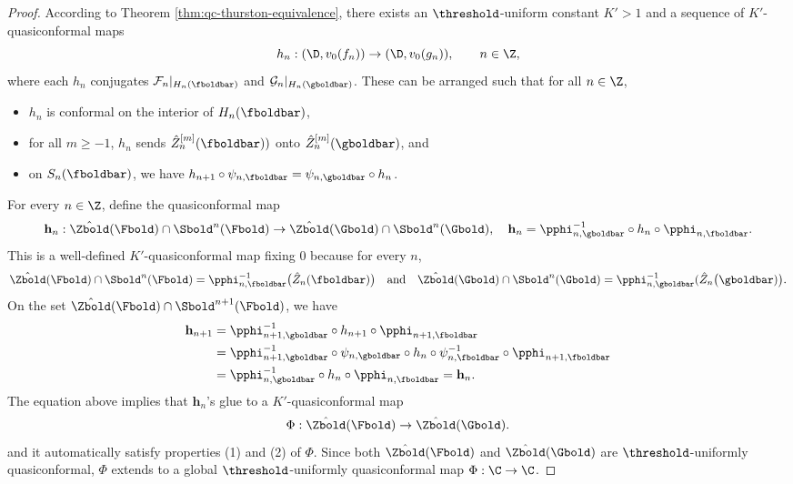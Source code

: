 \documentclass{amsart}
\begin{document}
\begin{proof}
    According to Theorem \ref{thm:qc-thurston-equivalence},
    there exists an $\threshold$-uniform constant $K'>1$ and a sequence of $K'$-quasiconformal maps 
    \[
    h_n: (\D, v_0(f_n)) \to (\D, v_0(g_n)), \qquad n \in \Z,
    \]
    where each $h_n$ conjugates $\mathcal{F}_n|_{H_n(\fboldbar)}$ and $\mathcal{G}_n|_{H_n(\gboldbar)}$.
    These can be arranged such that for all $n \in \Z$,
    \begin{itemize}
        \item $h_n$ is conformal on the interior of $H_n(\fboldbar)$,
        \item for all $m \geq -1$, $h_n$ sends $\hat{Z}^{[m]}_n(\fboldbar))$ onto $\hat{Z}^{[m]}_n(\gboldbar)$, and 
        \item on $S_n(\fboldbar)$, we have $h_{n+1} \circ \psi_{n,\fboldbar} = \psi_{n,\gboldbar} \circ h_n$.
    \end{itemize} 
    For every $n\in\Z$, define the quasiconformal map
    \[
        \mathbf{h}_n: \hat{\Zbold}(\Fbold) \cap \Sbold^n(\Fbold) \to \hat{\Zbold}(\Gbold) \cap \Sbold^n(\Gbold), \quad 
        \mathbf{h}_n = \pphi_{n,\gboldbar}^{-1} \circ h_n \circ \pphi_{n,\fboldbar}.
    \]
    This is a well-defined $K'$-quasiconformal map fixing $0$ because for every $n$,
    \[
        \hat{\Zbold}(\Fbold) \cap \Sbold^n(\Fbold) 
        = \pphi_{n,\fboldbar}^{-1} \big( \hat{Z}_{n}(\fboldbar) \big) \quad \text{and} \quad \hat{\Zbold}(\Gbold) \cap \Sbold^n(\Gbold) 
        = \pphi_{n,\gboldbar}^{-1}(\hat{Z}_{n} \big(\gboldbar) \big).
    \]
    On the set $\hat{\Zbold}(\Fbold) \cap \Sbold^{n+1}(\Fbold)$, we have
    \begin{align*}
    \mathbf{h}_{n+1} 
    &= \pphi_{n+1,\gboldbar}^{-1} \circ h_{n+1} \circ \pphi_{n+1,\fboldbar} \\
    &= \pphi_{n+1,\gboldbar}^{-1} \circ \psi_{n,\gboldbar} \circ h_n \circ \psi_{n,\fboldbar}^{-1} \circ \pphi_{n+1,\fboldbar} \\
    &= \pphi_{n,\gboldbar}^{-1} \circ h_n \circ \pphi_{n,\fboldbar} = \mathbf{h}_n.
    \end{align*}
    The equation above implies that $\mathbf{h}_n$'s glue to a $K'$-quasiconformal map
    \[
        \Phi: \hat{\Zbold}(\Fbold) \to \hat{\Zbold}(\Gbold).
    \]
    and it automatically satisfy properties (1) and (2) of $\Phi$.
    Since both $\hat{\Zbold}(\Fbold)$ and $\hat{\Zbold}(\Gbold)$ are $\threshold$-uniformly quasiconformal, $\Phi$ extends to a global $\threshold$-uniformly quasiconformal map $\Phi: \C \to \C$.
\end{proof}
\end{document}
